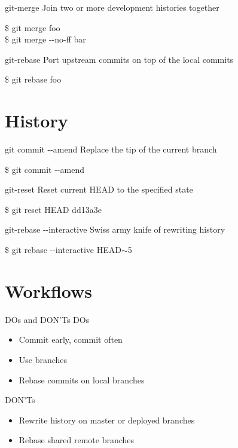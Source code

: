 \documentclass{beamer}
\begin{document}
\begin{frame}{git-merge}
  Join two or more development histories together
  \begin{Example}
    \$ git merge foo \\
    \$ git merge -{}-no-ff bar
  \end{Example}
\end{frame}

\begin{frame}{git-rebase}
  Port upstream commits on top of the local commits
  \begin{Example}
    \$ git rebase foo
  \end{Example}
\end{frame}

\section{History}

\begin{frame}{git commit -{}-amend}
  Replace the tip of the current branch
  \begin{Example}
    \$ git commit -{}-amend
  \end{Example}
\end{frame}

\begin{frame}{git-reset}
  Reset current HEAD to the specified state
  \begin{Example}
    \$ git reset HEAD dd13a3e
  \end{Example}
\end{frame}

\begin{frame}{git-rebase -{}-interactive}
  Swiss army knife of rewriting history
  \begin{Example}
    \$ git rebase -{}-interactive HEAD$\sim$5
  \end{Example}
\end{frame}

\section{Workflows}

\begin{frame}{DOs and DON'Ts}
  DOs
  \begin{itemize}
  \item Commit early, commit often
  \item Use branches
  \item Rebase commits on local branches
  \end{itemize}
  DON'Ts
  \begin{itemize}
  \item Rewrite history on master or deployed branches
  \item Rebase shared remote branches
  \end{itemize}
\end{frame}
\end{document}
